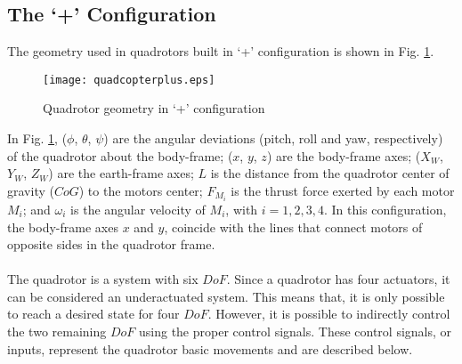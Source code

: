 \subsection{The `+' Configuration}
The geometry used in quadrotors built in `+' configuration is shown in Fig. \ref{fig:quadcopterplus}.
\\
\begin{figure}[H]
\begin{center}
  \texttt{[image: quadcopterplus.eps]}
\caption{Quadrotor geometry in `+' configuration} 
    \label{fig:quadcopterplus}
    \end{center}
\end{figure}
In Fig. \ref{fig:quadcopterplus}, ($\phi$, $\theta$, $\psi$) are the angular deviations (pitch, roll and yaw, respectively) of the quadrotor about the body-frame;
 ($x$, $y$, $z$) are the body-frame axes;  ($X_W$, $Y_W$, $Z_W$) are the earth-frame axes; $L$ is the distance from the quadrotor center of gravity ($CoG$) to the motors center; $F_{M_i}$ is the thrust force exerted by each motor $M_i$; and $\omega_i$ is the angular velocity of $M_i$, with $i = 1,2,3,4$. In this configuration, the body-frame axes $x$ and $y$, coincide with the lines that connect motors of opposite sides in the quadrotor frame.
\\\\
The quadrotor is a system with six $DoF$. Since a quadrotor has four actuators, it can be considered an underactuated system. This means that, it is only possible to reach a desired state for four $DoF$. However, it is possible to indirectly control the two remaining $DoF$ using the proper control signals. These control signals, or inputs, represent the quadrotor basic movements and are described below.

